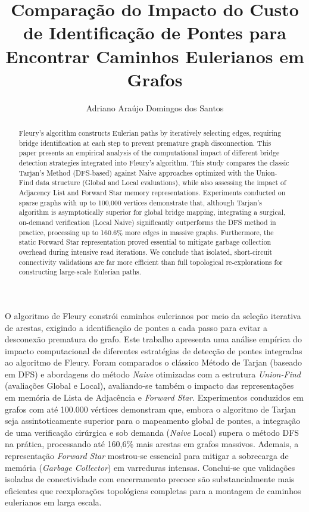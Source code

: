 \documentclass[12pt]{article}
\title{Comparação do Impacto do Custo de Identificação de Pontes para Encontrar Caminhos Eulerianos em Grafos}
\author{Adriano Araújo Domingos dos Santos\inst{1}}
\begin{document}
 

\maketitle

\begin{abstract}
Fleury's algorithm constructs Eulerian paths by iteratively selecting edges, requiring bridge identification at each step to prevent premature graph disconnection. This paper presents an empirical analysis of the computational impact of different bridge detection strategies integrated into Fleury's algorithm. This study compares the classic Tarjan's Method (DFS-based) against Naive approaches optimized with the Union-Find data structure (Global and Local evaluations), while also assessing the impact of Adjacency List and Forward Star memory representations. Experiments conducted on sparse graphs with up to 100,000 vertices demonstrate that, although Tarjan's algorithm is asymptotically superior for global bridge mapping, integrating a surgical, on-demand verification (Local Naive) significantly outperforms the DFS method in practice, processing up to 160.6\% more edges in massive graphs. Furthermore, the static Forward Star representation proved essential to mitigate garbage collection overhead during intensive read iterations. We conclude that isolated, short-circuit connectivity validations are far more efficient than full topological re-explorations for constructing large-scale Eulerian paths.
\end{abstract}
     
\begin{resumo}
O algoritmo de Fleury constrói caminhos eulerianos por meio da seleção iterativa de arestas, exigindo a identificação de pontes a cada passo para evitar a desconexão prematura do grafo. Este trabalho apresenta uma análise empírica do impacto computacional de diferentes estratégias de detecção de pontes integradas ao algoritmo de Fleury. Foram comparados o clássico Método de Tarjan (baseado em DFS) e abordagens do método \textit{Naive} otimizadas com a estrutura \textit{Union-Find} (avaliações Global e Local), avaliando-se também o impacto das representações em memória de Lista de Adjacência e \textit{Forward Star}. Experimentos conduzidos em grafos com até 100.000 vértices demonstram que, embora o algoritmo de Tarjan seja assintoticamente superior para o mapeamento global de pontes, a integração de uma verificação cirúrgica e sob demanda (\textit{Naive} Local) supera o método DFS na prática, processando até 160,6\% mais arestas em grafos massivos. Ademais, a representação \textit{Forward Star} mostrou-se essencial para mitigar a sobrecarga de memória (\textit{Garbage Collector}) em varreduras intensas. Conclui-se que validações isoladas de conectividade com encerramento precoce são substancialmente mais eficientes que reexplorações topológicas completas para a montagem de caminhos eulerianos em larga escala.
\end{resumo}
\end{document}

